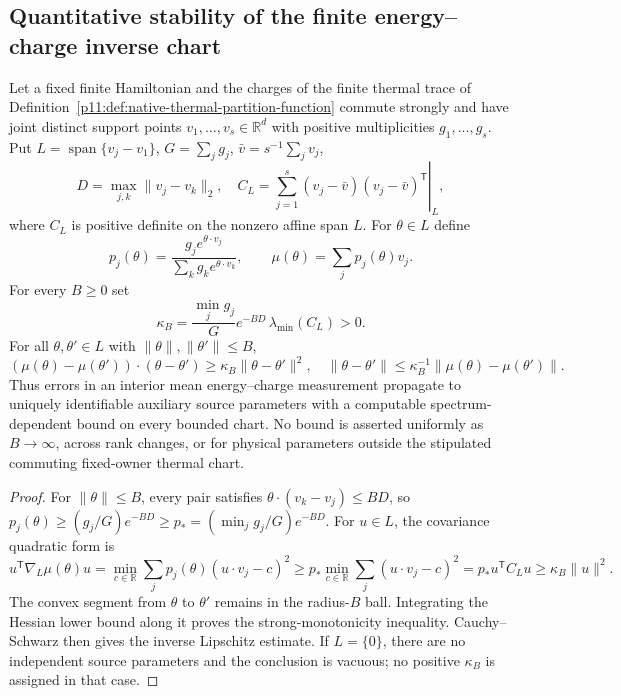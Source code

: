 \documentclass[12pt,a4paper]{article}
\begin{document}
\subsection{Quantitative stability of the finite energy--charge inverse chart}
\label{p11:sec:cc16-thermal-inverse-stability}
\begin{theorem}
\label{p11:thm:cc16-thermal-inverse-stability}
Let a fixed finite Hamiltonian and the charges of the finite thermal
trace of Definition~\ref{p11:def:native-thermal-partition-function}
commute strongly and have joint distinct support points
$v_1,\ldots,v_s\in\mathbb R^d$ with positive multiplicities
$g_1,\ldots,g_s$. Put $L=\operatorname{span}\{v_j-v_1\}$,
$G=\sum_jg_j$, $\bar v=s^{-1}\sum_jv_j$,
\[
 D=\max_{j,k}\|v_j-v_k\|_2,\quad
 C_L=\left.\sum_{j=1}^s(v_j-\bar v)(v_j-\bar v)^{\mathsf T}
 \right|_L,
\]
where $C_L$ is positive definite on the nonzero affine span $L$.
For $\theta\in L$ define
\[
 p_j(\theta)=\frac{g_j e^{\theta\cdot v_j}}
 {\sum_k g_ke^{\theta\cdot v_k}},\qquad
 \mu(\theta)=\sum_j p_j(\theta)v_j.
\]
For every $B\ge0$ set
\[
 \boxed{\kappa_B=\frac{\min_j g_j}{G}
 e^{-BD}\,\lambda_{\min}(C_L)>0.}
\]
For all $\theta,\theta'\in L$ with $\|\theta\|,\|\theta'\|\le B$,
\begin{equation}\label{p11:eq:cc16-thermal-inverse-stability}
\boxed{(\mu(\theta)-\mu(\theta'))\cdot(\theta-\theta')
 \ge\kappa_B\|\theta-\theta'\|^2,
\quad\|\theta-\theta'\|
 \le\kappa_B^{-1}\|\mu(\theta)-\mu(\theta')\|.}
\end{equation}
Thus errors in an interior mean energy--charge measurement propagate
to uniquely identifiable auxiliary source parameters with a
computable spectrum-dependent bound on every bounded chart.
No bound is asserted uniformly as $B\to\infty$, across rank changes,
or for physical parameters outside the stipulated commuting fixed-owner
thermal chart.
\end{theorem}
\begin{proof}
For $\|\theta\|\le B$, every pair satisfies
$\theta\cdot(v_k-v_j)\le BD$, so
$p_j(\theta)\ge(g_j/G)e^{-BD}\ge p_*= (\min_jg_j/G)e^{-BD}$.
For $u\in L$, the covariance quadratic form is
\[
 u^{\mathsf T}\nabla_L\mu(\theta)u
 =\min_{c\in\mathbb R}\sum_jp_j(\theta)(u\cdot v_j-c)^2
 \ge p_*\min_{c\in\mathbb R}\sum_j(u\cdot v_j-c)^2
 =p_*u^{\mathsf T}C_Lu\ge\kappa_B\|u\|^2.
\]
The convex segment from $\theta$ to $\theta'$ remains in the
radius-$B$ ball. Integrating the Hessian lower bound along it proves
the strong-monotonicity inequality. Cauchy--Schwarz then gives the
inverse Lipschitz estimate. If $L=\{0\}$, there are no independent
source parameters and the conclusion is vacuous; no positive
$\kappa_B$ is assigned in that case.
\end{proof}
\end{document}
